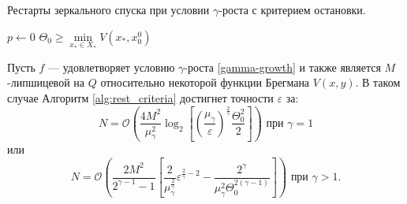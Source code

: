      \begin{algorithm}[htp]
        \caption{Рестарты зеркального спуска при условии $\gamma$-роста с критерием остановки.}
        \label{alg:rest_criteria}
        $p \gets 0$\;
        $\Theta_0 \geq \min\limits_{x_* \in X_*}{V(x_*,x_0^0)}$\;
    \end{algorithm}
    \begin{theorem}
        Пусть $f$ --- удовлетворяет условию $\gamma$-роста \eqref{gamma-growth} и также является $M$-липшицевой на $Q$ относительно некоторой функции Брегмана $V(x, y)$. В таком случае Алгоритм \ref{alg:rest_criteria} достигнет точности $\varepsilon$ за:
        \begin{equation}
           N = \mathcal{O} \left( \frac{4 M^2}{\mu_{\gamma}^2} \log_2{\left[\left(\frac{\mu_{\gamma}}{\varepsilon}\right)^{\frac{2}{\gamma}} \frac{\Theta_0^2}{2}\right]}\right) \text{ при } \gamma = 1
       \end{equation}
       или
       \begin{equation}
           N = \mathcal{O}\left( \frac{2 M^2 }{2^{\gamma - 1} - 1}\left[ \frac{2}{\mu_{\gamma}^{\frac{2}{\gamma}}}\varepsilon^{\frac{2}{\gamma} - 2} - \frac{2^{\gamma}}{\mu_{\gamma}^2 \Theta_0^{2(\gamma - 1)}} \right] \right) \text{ при } \gamma > 1.
       \end{equation}
    \end{theorem}

